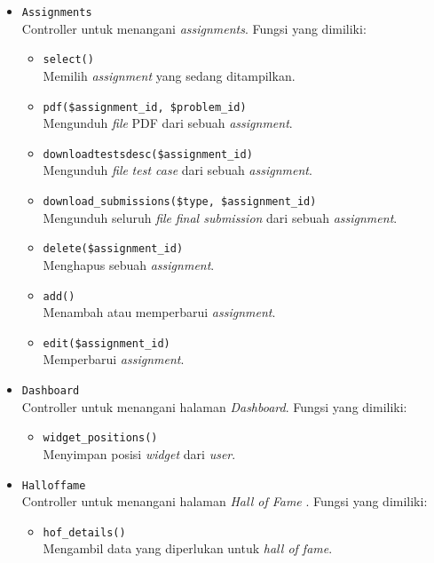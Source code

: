 \begin{itemize}
	\item \verb|Assignments| \\ Controller untuk menangani \textit{assignments}. Fungsi yang dimiliki:
	\begin{itemize}
		\item \verb|select()| \\ Memilih \textit{assignment} yang sedang ditampilkan.
		\item \verb|pdf($assignment_id, $problem_id)| \\ Mengunduh \textit{file} PDF dari sebuah \textit{assignment}.
		\item \verb|downloadtestsdesc($assignment_id)| \\ Mengunduh \textit{file} \textit{test case} dari sebuah \textit{assignment}.
		\item \verb|download_submissions($type, $assignment_id)| \\ Mengunduh seluruh \textit{file} \textit{final submission} dari sebuah \textit{assignment}.
		\item \verb|delete($assignment_id)| \\ Menghapus sebuah \textit{assignment}.
		\item \verb|add()| \\ Menambah atau memperbarui \textit{assignment}.
		\item \verb|edit($assignment_id)| \\ Memperbarui \textit{assignment}.
	\end{itemize}
	
	\item \verb|Dashboard| \\Controller untuk menangani halaman \textit{Dashboard}. Fungsi yang dimiliki:
	\begin{itemize}
		\item \verb|widget_positions()| \\ Menyimpan posisi \textit{widget} dari \textit{user}.
	\end{itemize}
	
	\item \verb|Halloffame| \\ Controller untuk menangani halaman \textit{Hall of Fame} . Fungsi yang dimiliki:
	\begin{itemize}
		\item \verb|hof_details()| \\ Mengambil data yang diperlukan untuk \textit{hall of fame}.
	\end{itemize}
	

\end{itemize}
